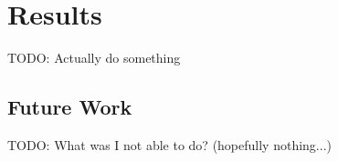 \chapter{Results}\label{cha:results}

TODO: Actually do something

\section{Future Work}\label{sec:futurework}

TODO: What was I not able to do? (hopefully nothing...)
